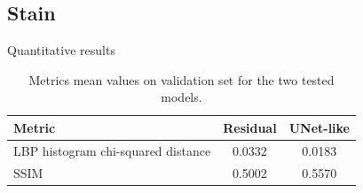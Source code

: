 \documentclass[t]{beamer}
\begin{document}
\subsection{Stain}


\begin{frame}{Quantitative results}
\begin{table}
\centering
\begin{tabular}{l|cc}
\toprule
Metric & Residual & UNet-like \\
\midrule
LBP histogram chi-squared distance & 0.0332 & 0.0183 \\
SSIM & 0.5002 & 0.5570 \\
\bottomrule
\end{tabular}
\caption{Metrics mean values on validation set for the two tested models.}
\label{tab:validation-stain}
\end{table}
\end{frame}
\end{document}
